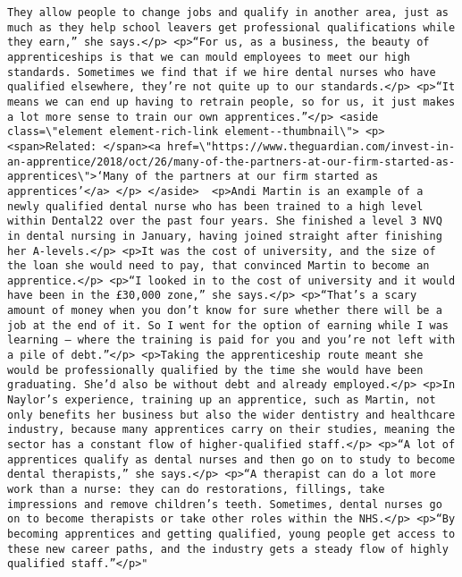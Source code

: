 \documentclass[]{article}
\begin{document}
\begin{verbatim}
They allow people to change jobs and qualify in another area, just as much as they help school leavers get professional qualifications while they earn,” she says.</p> <p>“For us, as a business, the beauty of apprenticeships is that we can mould employees to meet our high standards. Sometimes we find that if we hire dental nurses who have qualified elsewhere, they’re not quite up to our standards.</p> <p>“It means we can end up having to retrain people, so for us, it just makes a lot more sense to train our own apprentices.”</p> <aside class=\"element element-rich-link element--thumbnail\"> <p> <span>Related: </span><a href=\"https://www.theguardian.com/invest-in-an-apprentice/2018/oct/26/many-of-the-partners-at-our-firm-started-as-apprentices\">‘Many of the partners at our firm started as apprentices’</a> </p> </aside>  <p>Andi Martin is an example of a newly qualified dental nurse who has been trained to a high level within Dental22 over the past four years. She finished a level 3 NVQ in dental nursing in January, having joined straight after finishing her A-levels.</p> <p>It was the cost of university, and the size of the loan she would need to pay, that convinced Martin to become an apprentice.</p> <p>“I looked in to the cost of university and it would have been in the £30,000 zone,” she says.</p> <p>“That’s a scary amount of money when you don’t know for sure whether there will be a job at the end of it. So I went for the option of earning while I was learning – where the training is paid for you and you’re not left with a pile of debt.”</p> <p>Taking the apprenticeship route meant she would be professionally qualified by the time she would have been graduating. She’d also be without debt and already employed.</p> <p>In Naylor’s experience, training up an apprentice, such as Martin, not only benefits her business but also the wider dentistry and healthcare industry, because many apprentices carry on their studies, meaning the sector has a constant flow of higher-qualified staff.</p> <p>“A lot of apprentices qualify as dental nurses and then go on to study to become dental therapists,” she says.</p> <p>“A therapist can do a lot more work than a nurse: they can do restorations, fillings, take impressions and remove children’s teeth. Sometimes, dental nurses go on to become therapists or take other roles within the NHS.</p> <p>“By becoming apprentices and getting qualified, young people get access to these new career paths, and the industry gets a steady flow of highly qualified staff.”</p>"
\end{verbatim}
\end{document}
